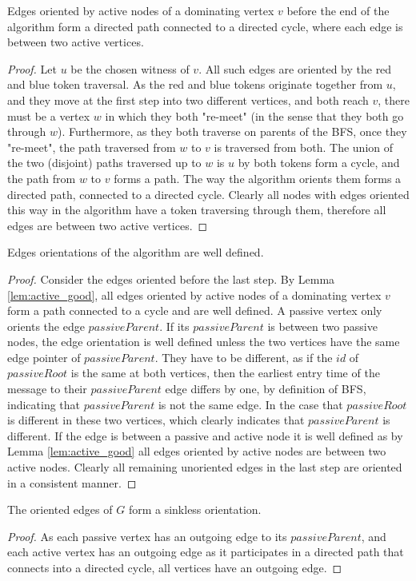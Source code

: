 \begin{lemma}
	\label{lem:active_good}
	Edges oriented by active nodes of a dominating vertex $v$ before the end of the algorithm form a directed path connected to a directed cycle, where each edge is between two active vertices.
\end{lemma}
\begin{proof}
	Let $u$ be the chosen witness of $v$. All such edges are oriented by the red and blue token traversal. As the red and blue tokens originate together from $u$, and they move at the first step into two different vertices, and both reach $v$, there must be a vertex $w$ in which they both "re-meet" (in the sense that they both go through $w$). Furthermore, as they both traverse on parents of the BFS, once they "re-meet", the path traversed from $w$ to $v$ is traversed from both. The union of the two (disjoint) paths traversed up to $w$ is $u$ by both tokens form a cycle, and the path from $w$ to $v$ forms a path. The way the algorithm orients them forms a directed path, connected to a directed cycle. Clearly all nodes with edges oriented this way in the algorithm have a token traversing through them, therefore all edges are between two active vertices.  
\end{proof}
\begin{lemma}
	Edges orientations  of the algorithm are well defined.
\end{lemma}
\begin{proof}
	Consider the edges oriented before the last step. By Lemma \ref{lem:active_good}, all edges oriented by active nodes of a dominating vertex $v$ form a path connected to a cycle and are well defined. A passive vertex only orients the edge $passiveParent$. If its $passiveParent$ is between two passive nodes, the edge orientation is well defined unless the two vertices have the same edge pointer of $passiveParent$.  They have to be different, as if the $id$ of $passiveRoot$ is the same at both vertices, then the earliest entry time of the message to their $passiveParent$ edge differs by one, by definition of BFS, indicating that $passiveParent$ is not the same edge. In the case that $passiveRoot$ is different in these two vertices, which clearly indicates that $passiveParent$ is different. If the edge is between a passive and active node it is well defined as by Lemma \ref{lem:active_good} all edges oriented by active nodes are between two active nodes. Clearly all remaining unoriented edges in the last step are oriented in a consistent manner.
\end{proof}
\begin{corollary}
	\label{lem:congest_is_sinkless}
	The oriented edges of $G$ form a sinkless orientation.
\end{corollary}
\begin{proof}
	As each passive vertex has an outgoing edge to its $passiveParent$, and each active vertex has an outgoing edge as it participates in a directed path that connects into a directed cycle, all vertices have an outgoing edge.
\end{proof}

